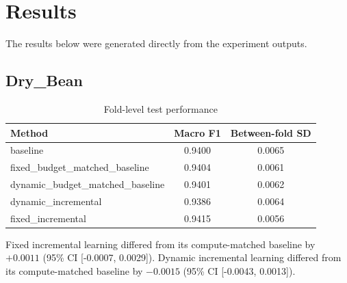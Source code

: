\section{Results}
The results below were generated directly from the experiment outputs. 
\subsection{Dry\_Bean}
\begin{table}[t]
\caption{Fold-level test performance}
\centering
\begin{tabular}{lcc}
\toprule
Method & Macro F1 & Between-fold SD\\
\midrule
baseline & 0.9400 & 0.0065\\
fixed\_budget\_matched\_baseline & 0.9404 & 0.0061\\
dynamic\_budget\_matched\_baseline & 0.9401 & 0.0062\\
dynamic\_incremental & 0.9386 & 0.0064\\
fixed\_incremental & 0.9415 & 0.0056\\
\bottomrule
\end{tabular}
\end{table}
\begin{table}[t]
\caption{Computational efficiency}
\centering
{}
\end{table}
Fixed incremental learning differed from its compute-matched baseline by $+0.0011$ (95\% CI [-0.0007, 0.0029]). Dynamic incremental learning differed from its compute-matched baseline by $-0.0015$ (95\% CI [-0.0043, 0.0013]).
